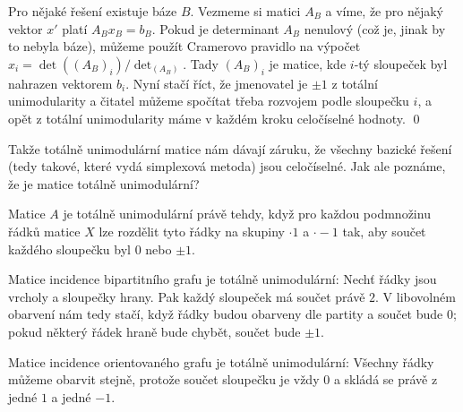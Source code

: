 \dk Pro nějaké řešení existuje báze $B$. Vezmeme si matici $A_B$ a víme, že pro
nějaký vektor $x'$ platí $A_Bx_B = b_B$. Pokud je determinant $A_B$ nenulový
(což je, jinak by to nebyla báze), můžeme použít Cramerovo pravidlo na výpočet
$x_i = \det((A_B)_i) / \det_(A_B)$. Tady $(A_B)_i$ je matice, kde $i$-tý
sloupeček byl nahrazen vektorem $b_i$. Nyní stačí říct, že jmenovatel je $\pm1$
z totální unimodularity a čitatel můžeme spočítat třeba rozvojem podle sloupečku
$i$, a opět z totální unimodularity máme v každém kroku celočíselné hodnoty.
\qed

Takže totálně unimodulární matice nám dávají záruku, že všechny bazické
řešení (tedy takové, které vydá simplexová metoda) jsou celočíselné. Jak ale
poznáme, že je matice totálně unimodulární?

\vt Matice $A$ je totálně unimodulární právě tehdy, když pro každou podmnožinu
řádků matice $X$ lze rozdělit tyto řádky na skupiny $\cdot 1$ a $\cdot -1$ tak,
aby součet každého sloupečku byl $0$ nebo $\pm 1$.

\poz Matice incidence bipartitního grafu je totálně unimodulární: Nechť řádky
jsou vrcholy a sloupečky hrany. Pak každý sloupeček má součet právě $2$. V
libovolném obarvení nám tedy stačí, když řádky budou obarveny dle partity a
součet bude $0$; pokud některý řádek hraně bude chybět, součet bude $\pm1$.

\poz Matice incidence orientovaného grafu je totálně unimodulární: Všechny řádky
můžeme obarvit stejně, protože součet sloupečku je vždy $0$ a skládá se právě z
jedné $1$ a jedné $-1$.
